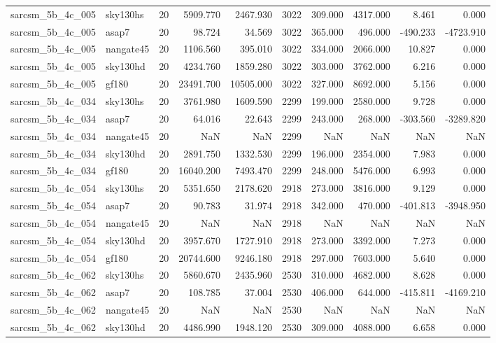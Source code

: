\begin{tabular}{llrrrrrrrr}
sarcsm\_5b\_4c\_005 & sky130hs & 20 & 5909.770 & 2467.930 & 3022 & 309.000 & 4317.000 & 8.461 & 0.000 \\
sarcsm\_5b\_4c\_005 & asap7 & 20 & 98.724 & 34.569 & 3022 & 365.000 & 496.000 & -490.233 & -4723.910 \\
sarcsm\_5b\_4c\_005 & nangate45 & 20 & 1106.560 & 395.010 & 3022 & 334.000 & 2066.000 & 10.827 & 0.000 \\
sarcsm\_5b\_4c\_005 & sky130hd & 20 & 4234.760 & 1859.280 & 3022 & 303.000 & 3762.000 & 6.216 & 0.000 \\
sarcsm\_5b\_4c\_005 & gf180 & 20 & 23491.700 & 10505.000 & 3022 & 327.000 & 8692.000 & 5.156 & 0.000 \\
sarcsm\_5b\_4c\_034 & sky130hs & 20 & 3761.980 & 1609.590 & 2299 & 199.000 & 2580.000 & 9.728 & 0.000 \\
sarcsm\_5b\_4c\_034 & asap7 & 20 & 64.016 & 22.643 & 2299 & 243.000 & 268.000 & -303.560 & -3289.820 \\
sarcsm\_5b\_4c\_034 & nangate45 & 20 & NaN & NaN & 2299 & NaN & NaN & NaN & NaN \\
sarcsm\_5b\_4c\_034 & sky130hd & 20 & 2891.750 & 1332.530 & 2299 & 196.000 & 2354.000 & 7.983 & 0.000 \\
sarcsm\_5b\_4c\_034 & gf180 & 20 & 16040.200 & 7493.470 & 2299 & 248.000 & 5476.000 & 6.993 & 0.000 \\
sarcsm\_5b\_4c\_054 & sky130hs & 20 & 5351.650 & 2178.620 & 2918 & 273.000 & 3816.000 & 9.129 & 0.000 \\
sarcsm\_5b\_4c\_054 & asap7 & 20 & 90.783 & 31.974 & 2918 & 342.000 & 470.000 & -401.813 & -3948.950 \\
sarcsm\_5b\_4c\_054 & nangate45 & 20 & NaN & NaN & 2918 & NaN & NaN & NaN & NaN \\
sarcsm\_5b\_4c\_054 & sky130hd & 20 & 3957.670 & 1727.910 & 2918 & 273.000 & 3392.000 & 7.273 & 0.000 \\
sarcsm\_5b\_4c\_054 & gf180 & 20 & 20744.600 & 9246.180 & 2918 & 297.000 & 7603.000 & 5.640 & 0.000 \\
sarcsm\_5b\_4c\_062 & sky130hs & 20 & 5860.670 & 2435.960 & 2530 & 310.000 & 4682.000 & 8.628 & 0.000 \\
sarcsm\_5b\_4c\_062 & asap7 & 20 & 108.785 & 37.004 & 2530 & 406.000 & 644.000 & -415.811 & -4169.210 \\
sarcsm\_5b\_4c\_062 & nangate45 & 20 & NaN & NaN & 2530 & NaN & NaN & NaN & NaN \\
sarcsm\_5b\_4c\_062 & sky130hd & 20 & 4486.990 & 1948.120 & 2530 & 309.000 & 4088.000 & 6.658 & 0.000 \\

\end{tabular}
